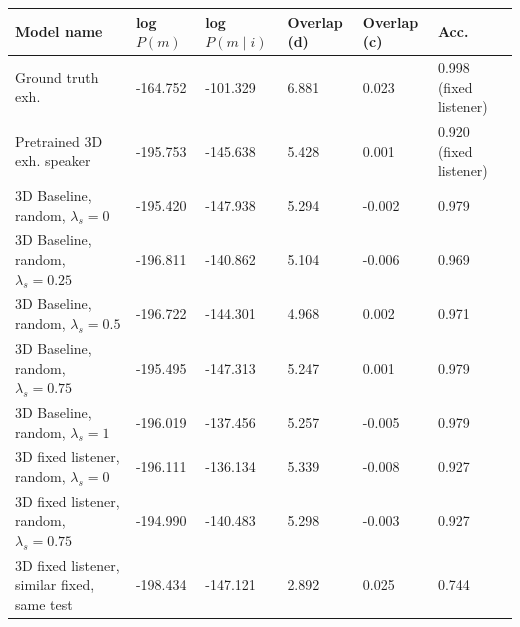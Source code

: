 \begin{table}[] 
	\begin{tabularx}{\textwidth}{|X|l|l|X|X|X|}
		\hline
		\textbf{Model name}                                    & \textbf{log $P(m)$} & \textbf{log $P(m \mid i)$} & \textbf{Overlap (d)} & \textbf{Overlap (c)} & \textbf{Acc.}  \\ \hline
		Ground truth exh.       &      -164.752            &         -101.329               &       6.881             &      0.023               &       0.998 (fixed listener)         \\ \hline
		Pretrained 3D exh. speaker                            &       -195.753            &         -145.638               &        5.428              &      0.001                & 0.920 (fixed listener)            \\ \hline
		3D Baseline, random, $\lambda_s = 0$ &       -195.420            &    -147.938                    &           5.294            &      -0.002                &                 0.979                 \\ \hline
		3D Baseline, random, $\lambda_s = 0.25$     &     -196.811              &       -140.862                 &          5.104            &       -0.006               &          0.969                      \\ \hline
		3D Baseline, random, $\lambda_s = 0.5$   &         -196.722          &        -144.301                &        4.968              &          0.002            &                  0.971            \\ \hline
		3D Baseline, random, $\lambda_s = 0.75$  &       -195.495        &           -147.313           &          5.247            &         0.001             & 0.979               \\ \hline
		3D Baseline, random, $\lambda_s = 1$   &      -196.019             &            -137.456             &        5.257              &          -0.005            &              0.979               \\ \hline
		3D fixed listener, random, $\lambda_s = 0$&      -196.111          &     -136.134                  &             5.339         &         -0.008            &                   0.927              \\ \hline
		3D fixed listener, random, $\lambda_s = 0.75$&      -194.990          &     -140.483                  &             5.298         &         -0.003            &                   0.927             \\ \hline
		3D fixed listener, similar fixed, same test &  -198.434       &      -147.121     &     2.892 &    0.025 &      0.744      \\ \hline

\end{tabularx}
\end{table}
